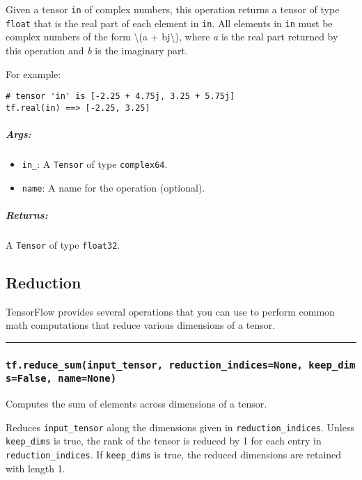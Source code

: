 Given a tensor \texttt{in} of complex numbers, this operation returns a
tensor of type \texttt{float} that is the real part of each element in
\texttt{in}. All elements in \texttt{in} must be complex numbers of the
form \textbackslash{}(a + bj\textbackslash{}), where \emph{a} is the
real part returned by this operation and \emph{b} is the imaginary part.

For example:

\begin{verbatim}
# tensor 'in' is [-2.25 + 4.75j, 3.25 + 5.75j]
tf.real(in) ==> [-2.25, 3.25]
\end{verbatim}

\subparagraph{Args: }\label{args-37}

\begin{itemize}
\tightlist
\item
  \texttt{in\_}: A \texttt{Tensor} of type \texttt{complex64}.
\item
  \texttt{name}: A name for the operation (optional).
\end{itemize}

\subparagraph{Returns: }\label{returns-37}

A \texttt{Tensor} of type \texttt{float32}.

\subsection{Reduction }\label{reduction}

TensorFlow provides several operations that you can use to perform
common math computations that reduce various dimensions of a tensor.

\begin{center}\rule{0.5\linewidth}{\linethickness}\end{center}

\subsubsection{\texorpdfstring{\texttt{tf.reduce\_sum(input\_tensor,\ reduction\_indices=None,\ keep\_dims=False,\ name=None)}
}{tf.reduce\_sum(input\_tensor, reduction\_indices=None, keep\_dims=False, name=None) }}\label{tf.reduceux5fsuminputux5ftensor-reductionux5findicesnone-keepux5fdimsfalse-namenone}

Computes the sum of elements across dimensions of a tensor.

Reduces \texttt{input\_tensor} along the dimensions given in
\texttt{reduction\_indices}. Unless \texttt{keep\_dims} is true, the
rank of the tensor is reduced by 1 for each entry in
\texttt{reduction\_indices}. If \texttt{keep\_dims} is true, the reduced
dimensions are retained with length 1.

